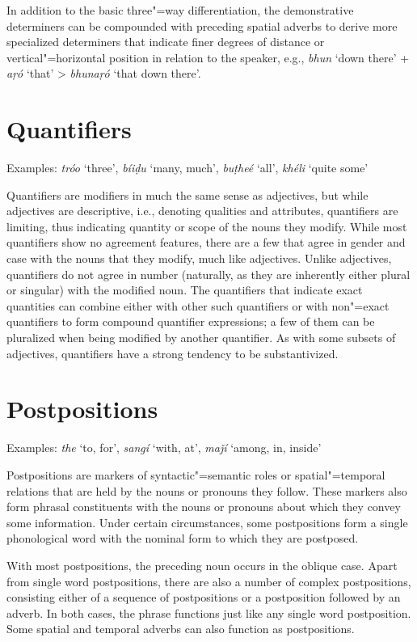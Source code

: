 In addition to the basic three"=way differentiation, the demonstrative determiners can be compounded with preceding spatial adverbs to derive more specialized determiners that  indicate finer degrees of distance or vertical"=horizontal position in relation to the speaker, e.g., \textit{bhun} `down there' + \textit{aṛó} `that' > \textit{bhunaṛó} `that down there'.


\section{Quantifiers}
\label{sec:3b-8}
Examples: \textit{tróo} `three', \textit{bíiḍu} `many, much', \textit{buṭheé} `all', \textit{khéli} `quite some'


Quantifiers are modifiers in much the same sense as adjectives, but while adjectives are descriptive, i.e., denoting qualities and attributes, quantifiers are limiting, thus indicating quantity or scope of the nouns they modify. While most quantifiers show no agreement features, there are a few that agree in gender and case with the nouns that they modify, much like adjectives. Unlike adjectives, quantifiers do not agree in number (naturally, as they are inherently either plural or singular) with the modified noun. The quantifiers that indicate exact quantities can combine either with other such quantifiers or with non"=exact quantifiers to form compound quantifier expressions; a few of them can be pluralized when being modified by another quantifier. As with some subsets of adjectives, quantifiers have a strong tendency to be substantivized.


\section{Postpositions}
\label{sec:3b-9}
Examples: \textit{the} `to, for', \textit{sangí} `with, at', \textit{maǰí} `among, in, inside'


Postpositions are markers of syntactic"=semantic roles or spatial"=temporal relations that are held by the nouns or pronouns they follow. These markers also form phrasal constituents with the nouns or pronouns about which they convey some information. Under certain circumstances, some postpositions form a single phonological word with the nominal form to which they are postposed.  


With most postpositions, the preceding noun occurs in the oblique case. Apart from single word postpositions, there are also a number of complex postpositions, consisting either of a sequence of postpositions or a postposition followed by an adverb. In both cases, the phrase functions just like any single word postposition. Some spatial and temporal adverbs can also function as postpositions.


